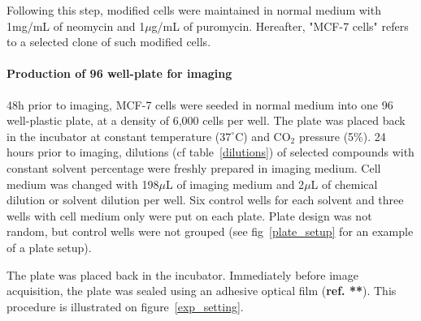 Following this step, modified cells were maintained in normal medium with 1mg/mL of neomycin and 1$\mu$g/mL of puromycin. Hereafter, "MCF-7 cells" refers to a selected clone of such modified cells.


\paragraph{Production of 96 well-plate for imaging}
48h prior to imaging, MCF-7 cells were seeded in normal medium into one 96 well-plastic plate, at a density of 6,000 cells per well. The plate was placed back in the incubator at constant temperature ($37^\circ$C) and CO$_2$ pressure (5\%). 24 hours prior to imaging, dilutions (cf table~\ref{dilutions}) of selected compounds with constant solvent percentage were freshly prepared in imaging medium. Cell medium was changed with 198$\mu$L of imaging medium and 2$\mu$L of chemical dilution or solvent dilution per well. Six control wells for each solvent and three wells with cell medium only were put on each plate. Plate design was not random, but control wells were not grouped (see fig~\ref{plate_setup} for an example of a plate setup).

The plate was placed back in the incubator. Immediately before image acquisition, the plate was sealed using an adhesive optical film (\textbf{ref. **}). This procedure is illustrated on figure~\ref{exp_setting}.

